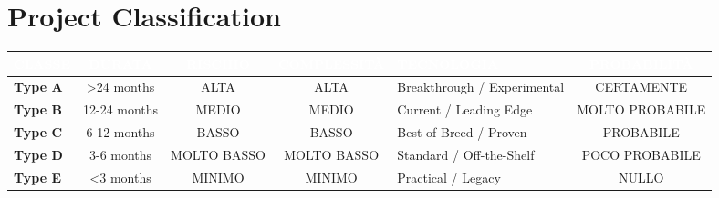 \documentclass[12pt, a4paper]{article}
\begin{document}
\section*{Project Classification}

\vspace{1em}

\begin{table}[htbp]
\centering
\small
\renewcommand{\arraystretch}{1.6} 

\begin{tabularx}{\textwidth}{l c c c X c} 
\toprule
\rowcolor{headerblue} 
\textcolor{white}{\textbf{CLASSE}} & 
\textcolor{white}{\textbf{DURATA}} & 
\textcolor{white}{\textbf{RISCHIO}} & 
\textcolor{white}{\textbf{COMPLESSITÀ}} & 
\textcolor{white}{\textbf{TECNOLOGIA}} & 
\textcolor{white}{\textbf{PROBABILITÀ}} \\
\midrule

\textbf{Type A} & >24 months   & ALTA        & ALTA        & Breakthrough / Experimental & CERTAMENTE \\
\textbf{Type B} & 12-24 months & MEDIO       & MEDIO       & Current / Leading Edge      & MOLTO PROBABILE \\
\textbf{Type C} & 6-12 months  & BASSO       & BASSO       & Best of Breed / Proven      & PROBABILE \\
\textbf{Type D} & 3-6 months   & MOLTO BASSO & MOLTO BASSO & Standard / Off-the-Shelf    & POCO PROBABILE \\
\textbf{Type E} & <3 months    & MINIMO      & MINIMO      & Practical / Legacy          & NULLO \\

\bottomrule
\end{tabularx}
\end{table}

\vspace{2em} 
\end{document}
